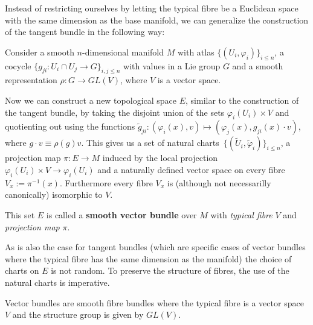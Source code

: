 	Instead of restricting ourselves by letting the typical fibre be a Euclidean space with the same dimension as the base manifold, we can generalize the construction of the tangent bundle in the following way:
		
	\begin{construct}
		\label{manifolds:vector_bundle_construction}
		Consider a smooth $n$-dimensional manifold $M$ with atlas $\{(U_i, \varphi_i)\}_{i\leq n}$, a cocycle $\{g_{ji}: U_i\cap U_j\rightarrow G\}_{i,j\leq n}$ with values in a Lie group $G$ and a smooth representation $\rho:G\rightarrow GL(V)$, where $V$ is a vector space.
		
		Now we can construct a new topological space $E$, similar to the construction of the tangent bundle, by taking the disjoint union of the sets $\varphi_i(U_i)\times V$ and quotienting out using the functions $\widetilde{g}_{ji}:(\varphi_i(x), v)\mapsto(\varphi_j(x), g_{ji}(x)\cdot v)$, where $g\cdot v\equiv \rho(g)v$. This gives us a set of natural charts\footnotemark\ $\{(\widetilde{U}_i, \widetilde{\varphi}_i)\}_{i\leq n}$, a projection map $\pi:E\rightarrow M$ induced by the local projection $\varphi_i(U_i)\times V\rightarrow\varphi_i(U_i)$ and a naturally defined vector space on every fibre $V_x:=\pi^{-1}(x)$. Furthermore every fibre $V_x$ is (although not necessarilly canonically) isomorphic to $V$.
		
		This set $E$ is called a \textbf{smooth vector bundle} over $M$ with \textit{typical fibre} $V$ and \textit{projection map} $\pi$.
	\end{construct}

	\begin{remark}
		As is also the case for tangent bundles (which are specific cases of vector bundles where the typical fibre has the same dimension as the manifold) the choice of charts on $E$ is not random. To preserve the structure of fibres, the use of the natural charts is imperative.
	\end{remark}
	\begin{remark}
		Vector bundles are smooth fibre bundles where the typical fibre is a vector space $V$ and the structure group is given by $GL(V)$.
	\end{remark}
	
